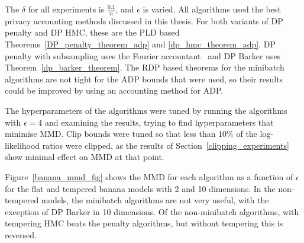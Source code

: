 \documentclass[english,twoside,openright]{HYgraduMLDS}
\begin{document}
The \(\delta\) for all experiments is \(\frac{0.1}{n}\), and \(\epsilon\) is
varied.
All algorithms used the best privacy accounting methods discussed in this thesis.
For both variants of DP penalty and DP HMC, these are the PLD based
Theorems~\ref{DP_penalty_theorem_adp} and \ref{dp_hmc_theorem_adp}.
DP penalty with subsampling uses the Fourier accountant~\cite{KJH20}
and DP Barker uses Theorem~\ref{dp_barker_theorem}. The RDP based theorems
for the minibatch algorithms are not tight for the ADP bounds that were used,
so their results could be improved by using an accounting method for ADP.

The hyperparameters of the algorithms
were tuned by running the algorithms with \(\epsilon = 4\) and examining the
results, trying to find hyperparameters that minimise MMD. Clip bounds were
tuned so that less than 10\% of the log-likelihood ratios were clipped,
as the results of Section~\ref{clipping_experiments} show minimal effect on
MMD at that point.

Figure~\ref{banana_mmd_fig} shows the MMD for each algorithm as a function of
\(\epsilon\) for the flat and tempered banana models with 2 and 10 dimensions.
In the non-tempered models, the minibatch algorithms are not very useful,
with the exception of DP Barker in 10 dimensions. Of the non-minibatch algorithms,
with tempering HMC beats the penalty algorithms, but without tempering this is
reversed.
\end{document}
